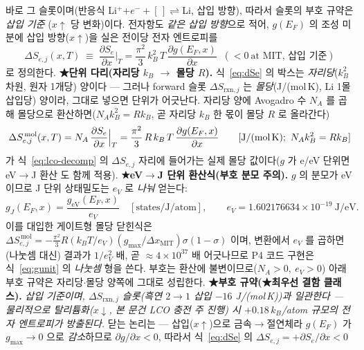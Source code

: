 \documentclass[11pt,a4paper]{article}
\newcommand{\rxn}{\mathrm{rxn}}
\begin{document}
바로 그 슬롯이며(반응식 Li$^+$$+e^-+[\,]\rightleftharpoons$Li, 삽입 방향), 따라서 슬롯의 부호 규약은 \emph{삽입 기준}
($x\!\uparrow$ 당 변화)이다. 전자항도 \emph{같은 삽입 방향}으로 적어, $g(E_F)$ 의 조성 미분에 삽입 방향($x\!\uparrow$)을
실은 전이당 전자 엔트로피를
\begin{equation}
\boxed{\;\Delta S_{e,j}(x,T)\;\equiv\;\frac{\partial S_e}{\partial x}\Big|_T
=\frac{\pi^2}{3}\,k_B^2\,T\,\frac{\partial g(E_F,x)}{\partial x}\;\;(<0\ \text{at MIT, 삽입 기준})\;}
\label{eq:dSe}
\end{equation}
로 정의한다. \textbf{★단위 다리(자리당 $k_B$ $\to$ 몰당 $R$).} 식~\eqref{eq:dSe} 의 박스는 \emph{자리당}($k_B^2$ 차원,
원자 1개당) 양이다 — 그러나 forward 슬롯 $\Delta S_{\rxn,j}$ 는 \emph{몰당}(J/(mol\,K), Li 1몰 삽입당) 양이라, 그대로
넣으면 단위가 어긋난다. 자리당 양에 Avogadro 수 $N_A$ 를 곱해 몰당으로 환산하면($N_A k_B^2=R k_B$, 곧 자리당 $k_B$ 한 몫이
몰당 $R$ 로 올라간다)
\begin{equation}
\Delta S_{e,j}^{\,\mathrm{mol}}(x,T)=N_A\,\frac{\partial S_e}{\partial x}\Big|_T
=\frac{\pi^2}{3}\,R\,k_B\,T\,\frac{\partial g(E_F,x)}{\partial x}
\qquad[\text{J/(mol\,K)};\ N_A k_B^2=R k_B]
\label{eq:dSemolar}
\end{equation}
가 식~\eqref{eq:lco-decomp} 의 $\Delta S_{e,j}$ 자리에 들어가는 실제 몰당 값이다($g$ 가 e/eV 단위면 eV$\to$J 환산
도 함께 적용). \textbf{★eV$\to$J 단위 환산식(부호 분모 주의).} $g$ 의 분모가 eV 이므로 J 단위 상태밀도는 $e_V$ 로
\emph{나눠} 얻는다:
\begin{equation}
g_J(E_F,x)=\frac{g_{\mathrm{eV}}(E_F,x)}{e_V}\quad[\text{states/J/atom}],
\qquad e_V=1.602176634\times10^{-19}\ \text{J/eV}.
\label{eq:gunit}
\end{equation}
이를 대입한 게이트형 몰당 닫힌식은 $\Delta S_{e,j}^{\,\mathrm{mol}}=-\tfrac{\pi^2}{3}R(k_BT/e_V)(g_{\max}/\Delta x_\mathrm{MIT})
\sigma(1-\sigma)$ 이며, 변환에서 $e_V$ 를 곱하면(나눗셈 대신) 결과가 $1/e_V^2$ 배, 곧 $\approx4\times10^{37}$ 배 어긋나므로
P4 코드 구현은 식~\eqref{eq:gunit} 의 \emph{나눗셈} 형을 쓴다. 부호는 환산에 불변이므로($N_A>0,\ e_V>0$) 아래 부호
규약은 자리당$\cdot$몰당 양쪽에 그대로 성립한다. \textbf{★부호 규약(★최우선 결함 클래스).} \emph{삽입 기준이며, $\Delta S_{\rxn,j}$ 슬롯(흑연 $2\!\to\!1$
삽입 $-16$ J/(mol\,K))과 일관한다 — 물리적으로 탈리튬화($x\!\downarrow$, 본 문건 LCO 충전 주 진행) 시 $+0.18\,k_B$/atom
규모의 전자 엔트로피가 방출된다.} 닫는 논리는 — 삽입($x\!\uparrow$)으로 금속$\to$절연체라 $g(E_F)$ 가 $g_{\max}\!\to\!0$
으로 \emph{감소}하므로 $\partial g/\partial x<0$, 따라서 식~\eqref{eq:dSe} 의 $\Delta S_{e,j}=+\partial S_e/\partial x<0$
$$
\end{document}
